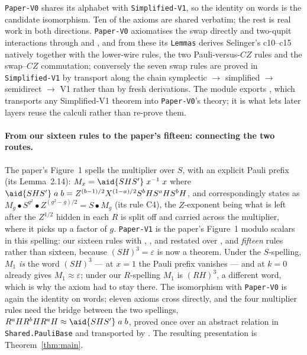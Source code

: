 \texttt{Paper-V0} shares its alphabet with \texttt{Simplified-V1}, so
the identity on words is the candidate isomorphism.  Ten of the axioms
are shared verbatim; the rest is real work in both
directions.  \texttt{Paper-V0} axiomatises the swap directly and
two-qupit interactions through  and
, and from these its \texttt{Lemmas}
derives Selinger's c10--c15 natively together with the lower-wire
rules, the two Pauli-versus-$CZ$ rules and the swap--$CZ$ commutation;
conversely the seven swap rules are proved in \texttt{Simplified-V1} by
transport along the chain symplectic $\to$ simplified $\to$ semidirect
$\to$ V1 rather than by fresh derivations.  The module exports , which
transports any Simplified-V1 theorem into \texttt{Paper-V0}'s theory;
it is what lets later layers reuse the calculi rather than re-prove
them.

\paragraph{From our sixteen rules to the paper's fifteen: connecting
the two routes.}  The paper's Figure~1 spells the multiplier over
$S$, with an explicit Pauli prefix (its Lemma~2.14): $M_x =
\aid{SHS'}\;x^{-1}\;x$ where $\aid{SHS'}\;a\;b = Z^{(b-1)/2}
X^{(1-a)/2} S^{b} H S^{a} H S^{b} H$, and correspondingly states
 as
$M_g \bullet S^{g^2} \bullet Z^{(g^2-g)/2} = S \bullet M_g$ (its rule
C4), the $Z$-exponent being what is left after the $Z^{1/2}$ hidden in
each $R$ is split off and carried across the multiplier, where it picks
up a factor of $g$.  \texttt{Paper-V1} is the paper's Figure~1 modulo scalars in
this spelling: our sixteen rules with ,
,  and  restated over
, and \emph{fifteen} rules rather than sixteen, because
$(SH)^3 = \varepsilon$ is now a theorem.
Under the $S$-spelling, $M_1$ \emph{is} the word $(SH)^3$ --- at $x = 1$
the Pauli prefix vanishes --- and  at $k = 0$ already
gives $M_1 \approx \varepsilon$; under our $R$-spelling $M_1$ is
$(RH)^3$, a different word, which is why the axiom had to stay there.
The isomorphism with \texttt{Paper-V0} is again the identity on words;
eleven axioms cross directly, and the four multiplier rules need the
bridge between the two spellings, $R^{a}HR^{b}HR^{a}H \approx
\aid{SHS'}\;a\;b$, proved once over an abstract relation in
\texttt{Shared.PauliBase} and transported by .  The resulting presentation is Theorem~\ref{thm:main}.
